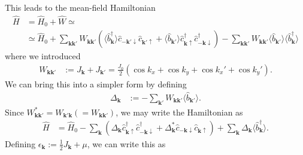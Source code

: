 \documentclass[english, parskip=full]{scrartcl}
\renewcommand{\bra}{}
\newcommand{\kla}{}
\begin{document}
This leads to the mean-field Hamiltonian
\begin{align}
\hat{H} &= \hat{H}_0 + \hat{W} \simeq \\
&\simeq \hat{H}_0 + \sum_{\mathbf{k}\mathbf{k}'} W_{\mathbf{k}\mathbf{k}'} \kla\left( \bra\langle \hat{b}_{\mathbf{k}}^\dagger \rangle\hat{c}_{-\mathbf{k}'\downarrow} \hat{c}_{\mathbf{k}'\uparrow} + \bra\langle \hat{b}_{\mathbf{k}'} \rangle \hat{c}_{\mathbf{k}\uparrow}^\dagger \hat{c}_{-\mathbf{k}\downarrow}^\dagger \right) - \sum_{\textbf{k}\textbf{k}'} W_{\textbf{k}\textbf{k}'} \bra\langle \hat{b}_{\mathbf{k}'} \rangle\bra\langle \hat{b}_{\mathbf{k}}^\dagger \rangle
\end{align}
where we introduced
\begin{align}
W_{\textbf{k}\textbf{k}'} &:= J_\textbf{k} + J_{\textbf{k}'} = \frac{J_0}{2} \kla\left( \cos k_x + \cos k_y + \cos k_x' + \cos k_y' \right).
\end{align}
We can bring this into a simpler form by defining 
\begin{align}
\Delta_{\mathbf{k}} &:= -\sum_{\mathbf{k}'} W_{\mathbf{k}\mathbf{k}'} \bra\langle \hat{b}_{\mathbf{k}'} \rangle.
\end{align}
Since $W_{\mathbf{k}\mathbf{k}'}^\ast = W_{\mathbf{k}'\mathbf{k}} (= W_{\mathbf{k}\mathbf{k}'})$, we may write the Hamiltonian as
\begin{align}
\hat{H} &= \hat{H}_0 - \sum_{\mathbf{k}} \kla\left( \Delta_{\mathbf{k}} \hat{c}_{\mathbf{k}\uparrow}^\dagger \hat{c}_{-\mathbf{k}\downarrow}^\dagger + \Delta_{\mathbf{k}}^\ast \hat{c}_{-\mathbf{k}\downarrow} \hat{c}_{\mathbf{k}\uparrow}  \right) + \sum_{\textbf{k}} \Delta_\textbf{k} \langle \hat{b}_{\mathbf{k}}^\dagger \rangle.
\end{align}
Defining $\epsilon_\textbf{k} := \frac{1}{2} J_\textbf{k} + \mu $, we can write this as
\end{document}

